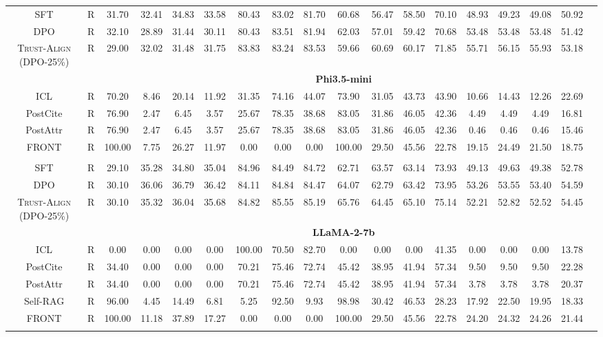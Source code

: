\documentclass{article} %
\newcommand{\method}[0]{\textsc{Trust-Align}}
\begin{document}
\begin{table}[htb!]
{\begin{tabular}{ccc*{15}c}
SFT& R & 31.70 & 32.41 & 34.83 & 33.58 & 80.43 & 83.02 & 81.70 & 60.68 & 56.47 & 58.50 & 70.10 & 48.93 & 49.23 & 49.08 & 50.92 \\
DPO& R & 32.10 & 28.89 & 31.44 & 30.11 & 80.43 & 83.51 & 81.94 & 62.03 & 57.01 & 59.42 & 70.68 & 53.48 & 53.48 & 53.48 & 51.42 \\
\method{} (DPO-25\%) & R & 29.00 & 32.02 & 31.48 & 31.75 & 83.83 & 83.24 & 83.53 & 59.66 & 60.69 & 60.17 & 71.85 & 55.71 & 56.15 & 55.93 & 53.18 \\

& & \multicolumn{15}{c}{\cellcolor[gray]{0.9}\textbf{Phi3.5-mini}} \\
ICL& R & 70.20 & 8.46 & 20.14 & 11.92 & 31.35 & 74.16 & 44.07 & 73.90 & 31.05 & 43.73 & 43.90 & 10.66 & 14.43 & 12.26 & 22.69 \\
PostCite & R & 76.90 & 2.47 & 6.45 & 3.57 & 25.67 & 78.35 & 38.68 & 83.05 & 31.86 & 46.05 & 42.36 & 4.49 & 4.49 & 4.49 & 16.81 \\
PostAttr & R & 76.90 & 2.47 & 6.45 & 3.57 & 25.67 & 78.35 & 38.68 & 83.05 & 31.86 & 46.05 & 42.36 & 0.46 & 0.46 & 0.46 & 15.46 \\
FRONT & R & 100.00 & 7.75 & 26.27 & 11.97 & 0.00 & 0.00 & 0.00 & 100.00 & 29.50 & 45.56 & 22.78 & 19.15 & 24.49 & 21.50 & 18.75 \\\\

SFT& R & 29.10 & 35.28 & 34.80 & 35.04 & 84.96 & 84.49 & 84.72 & 62.71 & 63.57 & 63.14 & 73.93 & 49.13 & 49.63 & 49.38 & 52.78 \\
DPO& R & 30.10 & 36.06 & 36.79 & 36.42 & 84.11 & 84.84 & 84.47 & 64.07 & 62.79 & 63.42 & 73.95 & 53.26 & 53.55 & 53.40 & 54.59 \\
\method{} (DPO-25\%) & R & 30.10 & 35.32 & 36.04 & 35.68 & 84.82 & 85.55 & 85.19 & 65.76 & 64.45 & 65.10 & 75.14 & 52.21 & 52.82 & 52.52 & 54.45 \\

& & \multicolumn{15}{c}{\cellcolor[gray]{0.9}\textbf{LLaMA-2-7b}} \\
ICL & R & 0.00 & 0.00 & 0.00 & 0.00 & 100.00 & 70.50 & 82.70 & 0.00 & 0.00 & 0.00 & 41.35 & 0.00 & 0.00 & 0.00 & 13.78 \\
PostCite & R & 34.40 & 0.00 & 0.00 & 0.00 & 70.21 & 75.46 & 72.74 & 45.42 & 38.95 & 41.94 & 57.34 & 9.50 & 9.50 & 9.50 & 22.28 \\
PostAttr & R & 34.40 & 0.00 & 0.00 & 0.00 & 70.21 & 75.46 & 72.74 & 45.42 & 38.95 & 41.94 & 57.34 & 3.78 & 3.78 & 3.78 & 20.37 \\
Self-RAG & R & 96.00 & 4.45 & 14.49 & 6.81 & 5.25 & 92.50 & 9.93 & 98.98 & 30.42 & 46.53 & 28.23 & 17.92 & 22.50 & 19.95 & 18.33 \\
FRONT & R & 100.00 & 11.18 & 37.89 & 17.27 & 0.00 & 0.00 & 0.00 & 100.00 & 29.50 & 45.56 & 22.78 & 24.20 & 24.32 & 24.26 & 21.44 \\\\


\end{tabular}}
\end{table}
\end{document}
